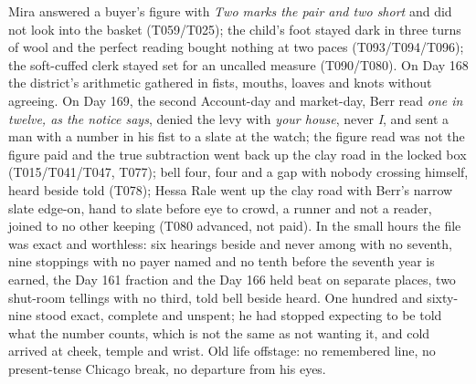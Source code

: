 \documentclass{design/chronicle}
\begin{document}
{\begin{itemize}[leftmargin=1.4em,itemsep=1pt,topsep=3pt,parsep=0pt]
Mira answered a buyer’s figure with \emph{Two marks the pair and two short} and did not look into the basket (T059/T025); the child’s foot stayed dark in three turns of wool and the perfect reading bought nothing at two paces (T093/T094/T096); the soft-cuffed clerk stayed set for an uncalled measure (T090/T080). On Day 168 the district’s arithmetic gathered in fists, mouths, loaves and knots without agreeing. On Day 169, the second Account-day and market-day, Berr read \emph{one in twelve, as the notice says}, denied the levy with \emph{your house}, never \emph{I}, and sent a man with a number in his fist to a slate at the watch; the figure read was not the figure paid and the true subtraction went back up the clay road in the locked box (T015/T041/T047, T077); bell four, four and a gap with nobody crossing himself, heard beside told (T078); Hessa Rale went up the clay road with Berr’s narrow slate edge-on, hand to slate before eye to crowd, a runner and not a reader, joined to no other keeping (T080 advanced, not paid). In the small hours the file was exact and worthless: six hearings beside and never among with no seventh, nine stoppings with no payer named and no tenth before the seventh year is earned, the Day 161 fraction and the Day 166 held beat on separate places, two shut-room tellings with no third, told bell beside heard. One hundred and sixty-nine stood exact, complete and unspent; he had stopped expecting to be told what the number counts, which is not the same as not wanting it, and cold arrived at cheek, temple and wrist. Old life offstage: no remembered line, no present-tense Chicago break, no departure from his eyes.

\end{itemize}

\begin{itemize}[leftmargin=1.4em,itemsep=1pt,topsep=3pt,parsep=0pt]


\end{itemize}}
\end{document}
